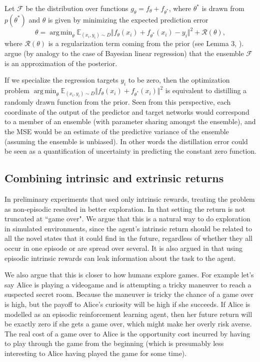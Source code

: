 \documentclass{article} %
\DeclareMathOperator*{\argmin}{arg\,min}
\begin{document}
Let $\mathcal{F}$ be the distribution over functions $g_\theta=f_\theta+f_{\theta^*}$, where $\theta^*$ is drawn from $p(\theta^*)$ and $\theta$ is given by minimizing the expected prediction error 
\begin{equation}
\theta = \argmin_{\theta} \mathbb{E}_{(x_i,y_i)\sim D}\Vert f_{\theta}(x_i)+f_{\theta^*}(x_i)-y_i\Vert ^2 + \mathcal{R}(\theta),
\end{equation}
where $\mathcal{R}(\theta)$ is a regularization term coming from the prior (see Lemma 3, \cite{osband2018randomized}).
\citet{osband2018randomized} argue (by analogy to the case of Bayesian linear regression) that the ensemble $\mathcal{F}$ is an approximation of the posterior.

If we specialize the regression targets $y_i$ to be zero, then the optimization problem $\argmin_{\theta} \mathbb{E}_{(x_i,y_i)\sim D}\Vert f_{\theta}(x_i)+f_{\theta^*}(x_i)\Vert ^2$ is equivalent to distilling a randomly drawn function from the prior. Seen from this perspective, each coordinate of the output of the predictor and target networks would correspond to a member of an ensemble (with parameter sharing amongst the ensemble), and the MSE would be an estimate of the predictive variance of the ensemble (assuming the ensemble is unbiased). In other words the distillation error could be seen as a quantification of uncertainty in predicting the constant zero function.

\subsection{Combining intrinsic and extrinsic returns}
\label{sec:methods_two_heads}
In preliminary experiments that used only intrinsic rewards, treating the problem as non-episodic resulted in better exploration. In that setting the return is not truncated at ``game over". We argue that this is a natural way to do exploration in simulated environments, since the agent's intrinsic return should be related to all the novel states that it could find in the future, regardless of whether they all occur in one episode or are spread over several. It is also argued in \citep{burda18largescale} that using episodic intrinsic rewards can leak information about the task to the agent.

We also argue that this is closer to how humans explore games. For example let's say Alice is playing a videogame and is attempting a tricky maneuver to reach a suspected secret room. Because the maneuver is tricky the chance of a game over is high, but the payoff to Alice's curiosity will be high if she succeeds. If Alice is modelled as an episodic reinforcement learning agent, then her future return will be exactly zero if she gets a game over, which might make her overly risk averse. The real cost of a game over to Alice is the opportunity cost incurred by having to play through the game from the beginning (which is presumably less interesting to Alice having played the game for some time).
\end{document}
